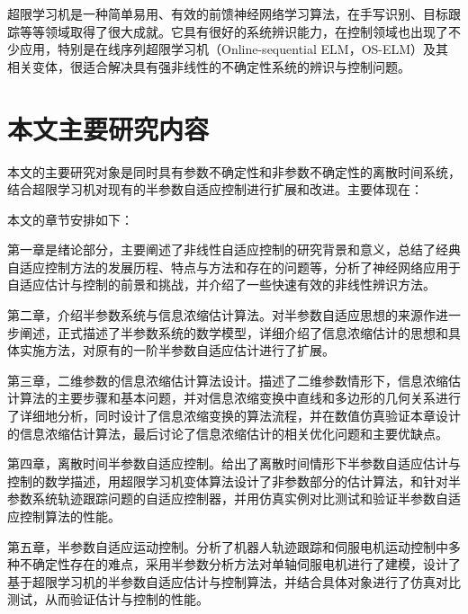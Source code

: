 超限学习机是一种简单易用、有效的前馈神经网络学习算法，在手写识别、目标跟踪等等领域取得了很大成就。它具有很好的系统辨识能力，在控制领域也出现了不少应用，特别是在线序列超限学习机（Online-sequential ELM，OS-ELM）及其相关变体，很适合解决具有强非线性的不确定性系统的辨识与控制问题。

\section{本文主要研究内容}\label{sect:1.3}

本文的主要研究对象是同时具有参数不确定性和非参数不确定性的离散时间系统，结合超限学习机对现有的半参数自适应控制进行扩展和改进。主要体现在：

本文的章节安排如下：

第一章是绪论部分，主要阐述了非线性自适应控制的研究背景和意义，总结了经典自适应控制方法的发展历程、特点与方法和存在的问题等，分析了神经网络应用于自适应估计与控制的前景和挑战，并介绍了一些快速有效的非线性辨识方法。

第二章，介绍半参数系统与信息浓缩估计算法。对半参数自适应思想的来源作进一步阐述，正式描述了半参数系统的数学模型，详细介绍了信息浓缩估计的思想和具体实施方法，对原有的一阶半参数自适应估计进行了扩展。

第三章，二维参数的信息浓缩估计算法设计。描述了二维参数情形下，信息浓缩估计算法的主要步骤和基本问题，并对信息浓缩变换中直线和多边形的几何关系进行了详细地分析，同时设计了信息浓缩变换的算法流程，并在数值仿真验证本章设计的信息浓缩估计算法，最后讨论了信息浓缩估计的相关优化问题和主要优缺点。

第四章，离散时间半参数自适应控制。给出了离散时间情形下半参数自适应估计与控制的数学描述，用超限学习机变体算法设计了非参数部分的估计算法，和针对半参数系统轨迹跟踪问题的自适应控制器，并用仿真实例对比测试和验证半参数自适应控制算法的性能。

第五章，半参数自适应运动控制。分析了机器人轨迹跟踪和伺服电机运动控制中多种不确定性存在的难点，采用半参数分析方法对单轴伺服电机进行了建模，设计了基于超限学习机的半参数自适应估计与控制算法，并结合具体对象进行了仿真对比测试，从而验证估计与控制的性能。
